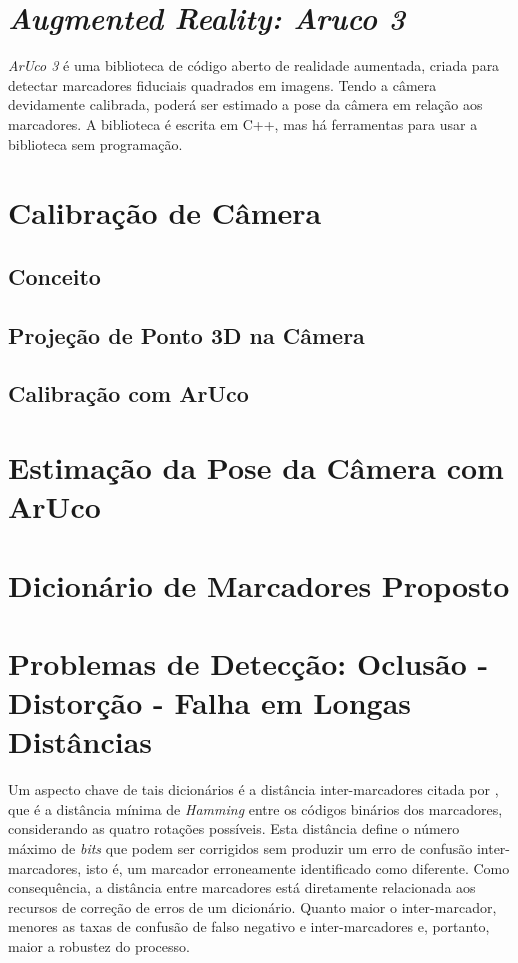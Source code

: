 \section{\textit{Augmented Reality: Aruco 3}}

\textit{ArUco 3} é uma biblioteca de código aberto de realidade aumentada, criada para detectar marcadores fiduciais quadrados em imagens. Tendo a câmera devidamente calibrada, poderá ser estimado a pose da câmera em relação aos marcadores. A biblioteca é escrita em C++, mas há ferramentas para usar a biblioteca sem programação.

\section{Calibração de Câmera}

\subsection{Conceito}

\subsection{Projeção de Ponto 3D na Câmera}

\subsection{Calibração com ArUco}

\section{Estimação da Pose da Câmera com ArUco}

\section{Dicionário de Marcadores Proposto}

\section{Problemas de Detecção: Oclusão - Distorção - Falha em Longas Distâncias}

Um aspecto chave de tais dicionários é a distância inter-marcadores citada por \citet{Fiala2010}, que é a distância mínima de \textit{Hamming} entre os códigos binários dos marcadores, considerando as quatro rotações possíveis. Esta distância define o número máximo de \textit{bits} que podem ser corrigidos sem produzir um erro de confusão inter-marcadores, isto é, um marcador erroneamente identificado como diferente. Como consequência, a distância entre marcadores está diretamente relacionada aos recursos de correção de erros de um dicionário. Quanto maior o inter-marcador, menores as taxas de confusão de falso negativo e inter-marcadores e, portanto, maior a robustez do processo.


